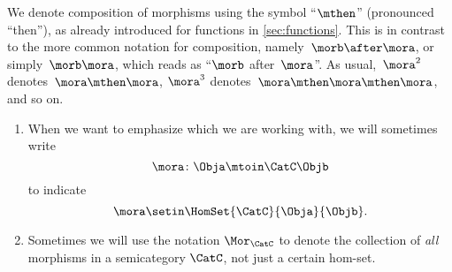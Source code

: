 \begin{remark}
    We denote composition of morphisms using the symbol ``$\mthen$'' (pronounced ``then''), as already introduced for functions in \cref{sec:functions}.
    This is in contrast to the more common notation for composition, namely~$\morb\after \mora$, or simply~$\morb \mora$, which reads as ``$\morb$ after~$\mora$''.
    As usual,~$\mora^2$ denotes~$\mora \mthen \mora$, $\mora^3$ denotes~$\mora \mthen \mora \mthen \mora$, and so on.
\end{remark}

\begin{remark}
    \begin{enumerate}
        \item When we want to emphasize which  we are working with, we will sometimes write
              \begin{equation}
                  \mora \colon \Obja \mtoin\CatC \Objb
              \end{equation}
              to indicate
              \begin{equation}
                  \mora \setin \HomSet{\CatC}{\Obja}{\Objb}.
              \end{equation}
        \item Sometimes we will use the notation $\Mor_\CatC$ to denote the collection of \emph{all} morphisms in a semicategory $\CatC$, not just a certain hom-set.
    \end{enumerate}
\end{remark}


\begin{marginfigure}
    \centering
    \caption{}
    \label{fig:points-and-two-arrows-diagram}
\end{marginfigure}

\begin{marginfigure}
    \centering
    \caption{}
    \label{fig:points-and-composed-arrows-diagram}
\end{marginfigure}

